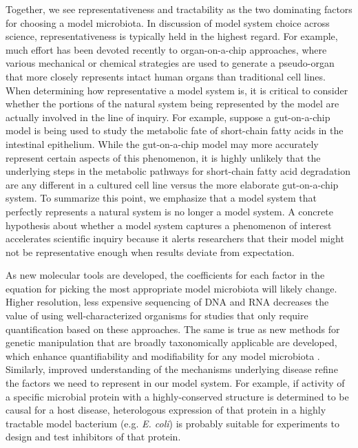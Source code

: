 \documentclass[11pt,onecolumn,notitlepage,openany,twoside]{book}
\begin{document}
\begin{refsection}
Together, we see representativeness and tractability as the two dominating factors for choosing a model microbiota. In discussion of model system choice across science, representativeness is typically held in the highest regard. For example, much effort has been devoted recently to organ-on-a-chip approaches, where various mechanical or chemical strategies are used to generate a pseudo-organ that more closely represents intact human organs than traditional cell lines. When determining how representative a model system is, it is critical to consider whether the portions of the natural system being represented by the model are actually involved in the line of inquiry. For example, suppose a gut-on-a-chip model is being used to study the metabolic fate of short-chain fatty acids in the intestinal epithelium. While the gut-on-a-chip model may more accurately represent certain aspects of this phenomenon, it is highly unlikely that the underlying steps in the metabolic pathways for short-chain fatty acid degradation are any different in a cultured cell line versus the more elaborate gut-on-a-chip system. To summarize this point, we emphasize that a model system that perfectly represents a natural system is no longer a model system. A concrete hypothesis about whether a model system captures a phenomenon of interest accelerates scientific inquiry because it alerts researchers that their model might not be representative enough when results deviate from expectation.

As new molecular tools are developed, the coefficients for each factor in the equation for picking the most appropriate model microbiota will likely change. Higher resolution, less expensive sequencing of DNA and RNA decreases the value of using well-characterized organisms for studies that only require quantification based on these approaches. The same is true as new methods for genetic manipulation that are broadly taxonomically applicable are developed, which enhance quantifiability and modifiability for any model microbiota \cite{Leonard2018-pq}. Similarly, improved understanding of the mechanisms underlying disease refine the factors we need to represent in our model system. For example, if activity of a specific microbial protein with a highly-conserved structure is determined to be causal for a host disease, heterologous expression of that protein in a highly tractable model bacterium (e.g. \textit{E. coli}) is probably suitable for experiments to design and test inhibitors of that protein.


\end{refsection}
\end{document}
